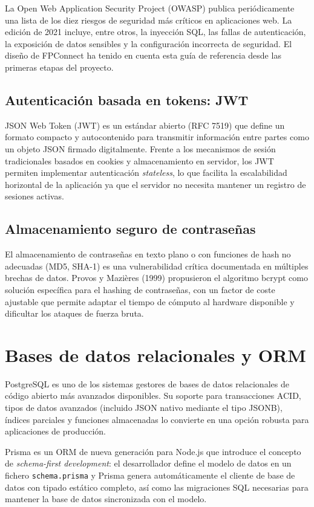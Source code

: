 \documentclass[a4paper]{report}
\begin{document}
La Open Web Application Security Project (OWASP) publica periódicamente una lista de los diez riesgos de seguridad más críticos en aplicaciones web. La edición de 2021 incluye, entre otros, la inyección SQL, las fallas de autenticación, la exposición de datos sensibles y la configuración incorrecta de seguridad. El diseño de FPConnect ha tenido en cuenta esta guía de referencia desde las primeras etapas del proyecto.

\subsection{Autenticación basada en tokens: JWT}

JSON Web Token (JWT) es un estándar abierto (RFC 7519) que define un formato compacto y autocontenido para transmitir información entre partes como un objeto JSON firmado digitalmente. Frente a los mecanismos de sesión tradicionales basados en cookies y almacenamiento en servidor, los JWT permiten implementar autenticación \textit{stateless}, lo que facilita la escalabilidad horizontal de la aplicación ya que el servidor no necesita mantener un registro de sesiones activas.

\subsection{Almacenamiento seguro de contraseñas}

El almacenamiento de contraseñas en texto plano o con funciones de hash no adecuadas (MD5, SHA-1) es una vulnerabilidad crítica documentada en múltiples brechas de datos. Provos y Mazières (1999) propusieron el algoritmo bcrypt como solución específica para el hashing de contraseñas, con un factor de coste ajustable que permite adaptar el tiempo de cómputo al hardware disponible y dificultar los ataques de fuerza bruta.

\section{Bases de datos relacionales y ORM}

PostgreSQL es uno de los sistemas gestores de bases de datos relacionales de código abierto más avanzados disponibles. Su soporte para transacciones ACID, tipos de datos avanzados (incluido JSON nativo mediante el tipo JSONB), índices parciales y funciones almacenadas lo convierte en una opción robusta para aplicaciones de producción.

Prisma es un ORM de nueva generación para Node.js que introduce el concepto de \textit{schema-first development}: el desarrollador define el modelo de datos en un fichero \texttt{schema.prisma} y Prisma genera automáticamente el cliente de base de datos con tipado estático completo, así como las migraciones SQL necesarias para mantener la base de datos sincronizada con el modelo.
\end{document}
